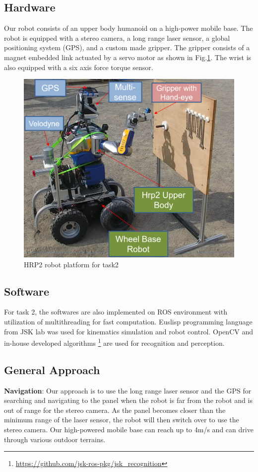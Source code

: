 \documentclass{standalone}
\begin{document}
\subsection{Hardware}
Our robot consists of an upper body humanoid on a high-power mobile base. The robot is equipped with a stereo camera, a long range laser sensor, a global positioning system (GPS), and a custom made gripper. The gripper consists of a magnet embedded link actuated by a servo motor as shown in Fig.\ref{fig:figure1}. The wrist is also equipped with a six axis force torque sensor. 


\begin{figure}[t]
  \includegraphics[width=\columnwidth]{sections/task2/images/hrp2}
  \caption{HRP2 robot platform for task2}
  \label{fig:figure1}
\end{figure}

\subsection{Software}

For task 2, the softwares are also implemented on ROS environment with utilization of multithreading for fast computation. Euslisp programming language from JSK lab was used for kinematics simulation and robot control. OpenCV and in-house developed algorithms
 \footnote{\url{https://github.com/jsk-ros-pkg/jsk_recognition}} are used for recognition and perception.


 \subsection{General Approach}
 \textbf{Navigation}: Our approach is to use the long range laser sensor and the GPS for searching and navigating to the panel when the robot is far from the robot and is out of range for the stereo camera. As the panel becomes closer than the minimum range of the laser sensor, the robot will then switch over to use the stereo camera. Our high-powered mobile base can reach up to 4m/s and can drive through various outdoor terrains. 
\end{document}
